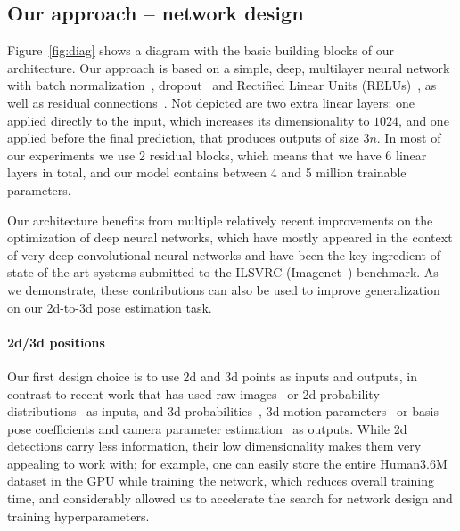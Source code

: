 \documentclass[10pt,twocolumn,letterpaper]{article}
\begin{document}
\subsection{Our approach -- network design}

Figure~\ref{fig:diag} shows a diagram with the basic building blocks of our architecture.
Our approach is based on a simple, deep, multilayer neural network with batch normalization~\cite{batch-norm}, dropout~\cite{dropout} and Rectified Linear Units (RELUs)~\cite{relu}, as well as residual connections~\cite{he2016deep}.
Not depicted are two extra linear layers: one applied directly to the input, which increases its dimensionality to $1024$, and one applied before the final prediction, that produces outputs of size $3n$.
In most of our experiments we use 2 residual blocks, which means that we have 6 linear layers in total, and our model contains between 4 and 5 million trainable parameters.

Our architecture benefits from multiple relatively recent improvements on the optimization of deep neural networks, which have mostly appeared in the context of very deep convolutional neural networks and have been the key ingredient of state-of-the-art systems submitted to the ILSVRC (Imagenet~\cite{imagenet}) benchmark. As we demonstrate, these contributions can also be used to improve generalization on our 2d-to-3d pose estimation task.

\paragraph{2d/3d positions} Our first design choice is to use 2d and 3d points as inputs and outputs, in contrast to recent work that has used raw images~\cite{volumetric,tekin2016structured,zhou2016deep,park20163d,tekin2016direct,ghezelghieh2016learning,du2016marker,li2015maximum,zhou2016sparseness} or 2d probability distributions~\cite{zhou2016sparseness,volumetric} as inputs, and 3d probabilities~\cite{volumetric}, 3d motion parameters~\cite{zhou2016deep} or basis pose coefficients and camera parameter estimation~\cite{Ramakrishna:2012,akhter-and-black,keep-it-simpl,zhou2016sparseness,zhou2016sparse} as outputs. While 2d detections carry less information, their low dimensionality makes them very appealing to work with; for example, one can easily store the entire Human3.6M dataset in the GPU while training the network, which reduces overall training time, and considerably allowed us to accelerate the search for network design and training hyperparameters. 
\end{document}
